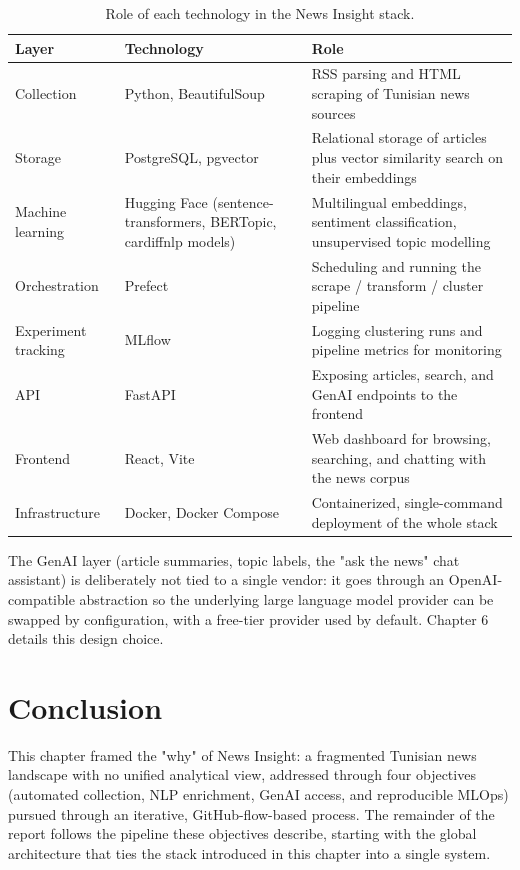 \begin{table}[H]
\centering
\begin{tabular}{|>{\raggedright\arraybackslash}p{2.6cm}|p{4.9cm}|p{7.4cm}|}
\hline
\textbf{Layer} & \textbf{Technology} & \textbf{Role} \\
\hline
Collection & Python, BeautifulSoup & RSS parsing and HTML scraping of Tunisian news sources \\
\hline
Storage & PostgreSQL, pgvector & Relational storage of articles plus vector similarity search on their embeddings \\
\hline
Machine learning & Hugging Face (sentence-transformers, BERTopic, cardiffnlp models) & Multilingual embeddings, sentiment classification, unsupervised topic modelling \\
\hline
Orchestration & Prefect & Scheduling and running the scrape / transform / cluster pipeline \\
\hline
Experiment tracking & MLflow & Logging clustering runs and pipeline metrics for monitoring \\
\hline
API & FastAPI & Exposing articles, search, and GenAI endpoints to the frontend \\
\hline
Frontend & React, Vite & Web dashboard for browsing, searching, and chatting with the news corpus \\
\hline
Infrastructure & Docker, Docker Compose & Containerized, single-command deployment of the whole stack \\
\hline
\end{tabular}
\caption{Role of each technology in the News Insight stack.}
\label{tab:tech-stack}
\end{table}

The GenAI layer (article summaries, topic labels, the "ask the news" chat assistant) is deliberately not tied to a single vendor: it goes through an OpenAI-compatible abstraction so the underlying large language model provider can be swapped by configuration, with a free-tier provider used by default. Chapter 6 details this design choice.

\section{Conclusion}
This chapter framed the "why" of News Insight: a fragmented Tunisian news landscape with no unified analytical view, addressed through four objectives (automated collection, NLP enrichment, GenAI access, and reproducible MLOps) pursued through an iterative, GitHub-flow-based process. The remainder of the report follows the pipeline these objectives describe, starting with the global architecture that ties the stack introduced in this chapter into a single system.
